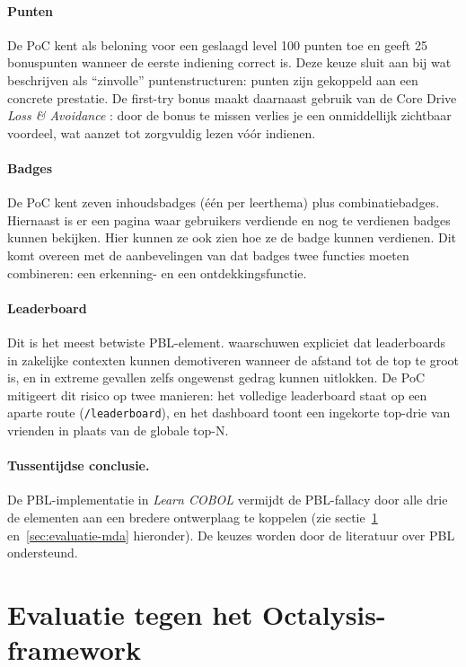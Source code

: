 \paragraph{Punten}
De PoC kent als beloning voor een geslaagd level 100 punten toe en geeft 25 bonuspunten wanneer de eerste indiening correct is. Deze keuze sluit aan bij wat \textcite{KevinWerbach2020} beschrijven als ``zinvolle'' puntenstructuren: punten zijn gekoppeld aan een concrete prestatie.
De first-try bonus maakt daarnaast gebruik van de Core Drive \textit{Loss \& Avoidance} \autocite{Chou2015}: door de bonus te missen verlies je een onmiddellijk zichtbaar voordeel, wat aanzet tot zorgvuldig lezen vóór indienen. 

\paragraph{Badges}
De PoC kent zeven inhoudsbadges (één per leerthema) plus combinatiebadges. 
Hiernaast is er een pagina waar gebruikers verdiende en nog te verdienen badges kunnen bekijken. Hier kunnen ze ook zien hoe ze de badge kunnen verdienen.
Dit komt overeen met de aanbevelingen van \textcite{KevinWerbach2020} dat badges twee functies moeten combineren: een erkenning- en een ontdekkingsfunctie.

\paragraph{Leaderboard}
Dit is het meest betwiste PBL-element. \textcite{KevinWerbach2020} waarschuwen expliciet dat leaderboards in zakelijke contexten kunnen demotiveren wanneer de afstand tot de top te groot is, en in extreme gevallen zelfs ongewenst gedrag kunnen uitlokken. 
De PoC mitigeert dit risico op twee manieren: het volledige leaderboard staat op een aparte route (\texttt{/leaderboard}), en het dashboard toont een ingekorte top-drie van vrienden in plaats van de globale top-N. 

\paragraph{Tussentijdse conclusie.}
De PBL-implementatie in \textit{Learn COBOL} vermijdt de PBL-fallacy door alle drie de elementen aan een bredere ontwerplaag te koppelen (zie sectie~\ref{sec:evaluatie-octalysis} en~\ref{sec:evaluatie-mda} hieronder).
De keuzes worden door de literatuur over PBL ondersteund.

\section{Evaluatie tegen het Octalysis-framework}
\label{sec:evaluatie-octalysis}

